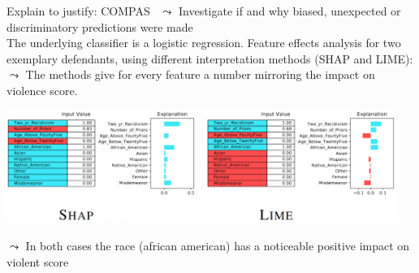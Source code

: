 \documentclass[11pt,compress,t,notes=noshow, aspectratio=169, xcolor=table]{beamer}
\begin{document}
\begin{frame}{Explain to justify: COMPAS~}
    $\leadsto$ Investigate if and why biased, unexpected or discriminatory predictions were made \\
    \medskip
    The underlying classifier is a logistic regression. Feature effects analysis for two exemplary defendants, using different interpretation methods (SHAP and LIME): \\
    $\leadsto$ The methods give for every feature a number mirroring the impact on violence score. 
    \vspace{0.5cm}
    
    \centering
    \includegraphics[width=0.95\textwidth]{figure/COMPAS_shap_lime_example.png}
    
    \vspace{0.2cm}
    $\leadsto$ In both cases the race (african american) has a noticeable positive impact on violent score
\end{frame}










    
	

\endlecture
\end{document}
